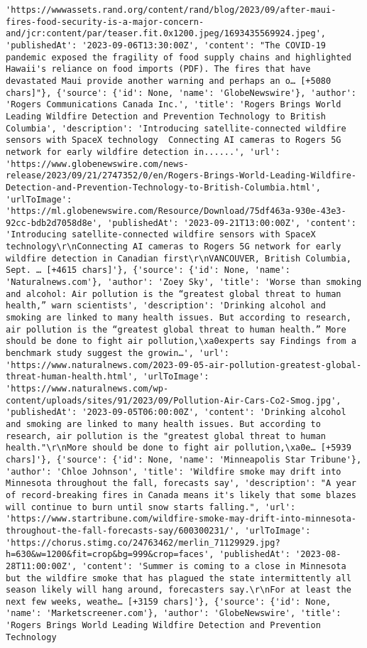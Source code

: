 \documentclass[
  letterpaper,
  DIV=11,
  numbers=noendperiod]{scrartcl}
\begin{document}
\begin{verbatim}
'https://wwwassets.rand.org/content/rand/blog/2023/09/after-maui-fires-food-security-is-a-major-concern-and/jcr:content/par/teaser.fit.0x1200.jpeg/1693435569924.jpeg', 'publishedAt': '2023-09-06T13:30:00Z', 'content': "The COVID-19 pandemic exposed the fragility of food supply chains and highlighted Hawaii's reliance on food imports (PDF). The fires that have devastated Maui provide another warning and perhaps an o… [+5080 chars]"}, {'source': {'id': None, 'name': 'GlobeNewswire'}, 'author': 'Rogers Communications Canada Inc.', 'title': 'Rogers Brings World Leading Wildfire Detection and Prevention Technology to British Columbia', 'description': 'Introducing satellite-connected wildfire sensors with SpaceX technology  Connecting AI cameras to Rogers 5G network for early wildfire detection in......', 'url': 'https://www.globenewswire.com/news-release/2023/09/21/2747352/0/en/Rogers-Brings-World-Leading-Wildfire-Detection-and-Prevention-Technology-to-British-Columbia.html', 'urlToImage': 'https://ml.globenewswire.com/Resource/Download/75df463a-930e-43e3-92cc-bdb2d7058d8e', 'publishedAt': '2023-09-21T13:00:00Z', 'content': 'Introducing satellite-connected wildfire sensors with SpaceX technology\r\nConnecting AI cameras to Rogers 5G network for early wildfire detection in Canadian first\r\nVANCOUVER, British Columbia, Sept. … [+4615 chars]'}, {'source': {'id': None, 'name': 'Naturalnews.com'}, 'author': 'Zoey Sky', 'title': 'Worse than smoking and alcohol: Air pollution is the “greatest global threat to human health,” warn scientists', 'description': 'Drinking alcohol and smoking are linked to many health issues. But according to research, air pollution is the “greatest global threat to human health.” More should be done to fight air pollution,\xa0experts say Findings from a benchmark study suggest the growin…', 'url': 'https://www.naturalnews.com/2023-09-05-air-pollution-greatest-global-threat-human-health.html', 'urlToImage': 'https://www.naturalnews.com/wp-content/uploads/sites/91/2023/09/Pollution-Air-Cars-Co2-Smog.jpg', 'publishedAt': '2023-09-05T06:00:00Z', 'content': 'Drinking alcohol and smoking are linked to many health issues. But according to research, air pollution is the "greatest global threat to human health."\r\nMore should be done to fight air pollution,\xa0e… [+5939 chars]'}, {'source': {'id': None, 'name': 'Minneapolis Star Tribune'}, 'author': 'Chloe Johnson', 'title': 'Wildfire smoke may drift into Minnesota throughout the fall, forecasts say', 'description': "A year of record-breaking fires in Canada means it's likely that some blazes will continue to burn until snow starts falling.", 'url': 'https://www.startribune.com/wildfire-smoke-may-drift-into-minnesota-throughout-the-fall-forecasts-say/600300231/', 'urlToImage': 'https://chorus.stimg.co/24763462/merlin_71129929.jpg?h=630&w=1200&fit=crop&bg=999&crop=faces', 'publishedAt': '2023-08-28T11:00:00Z', 'content': 'Summer is coming to a close in Minnesota but the wildfire smoke that has plagued the state intermittently all season likely will hang around, forecasters say.\r\nFor at least the next few weeks, weathe… [+3159 chars]'}, {'source': {'id': None, 'name': 'Marketscreener.com'}, 'author': 'GlobeNewswire', 'title': 'Rogers Brings World Leading Wildfire Detection and Prevention Technology 
\end{verbatim}
\end{document}
